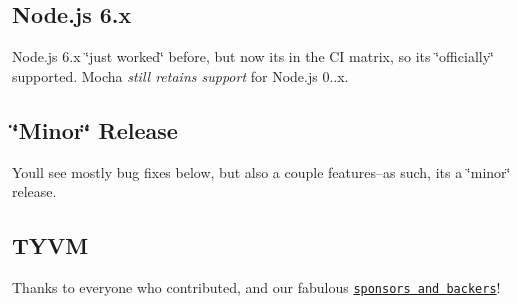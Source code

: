 \subsection*{Node.\+js 6.\+x}

Node.\+js 6.\+x \char`\"{}just worked\char`\"{} before, but now it\textquotesingle{}s in the CI matrix, so it\textquotesingle{}s \char`\"{}officially\char`\"{} supported. Mocha {\itshape still retains support} for Node.\+js 0..\+x.

\subsection*{\char`\"{}\+Minor\char`\"{} Release}

You\textquotesingle{}ll see mostly bug fixes below, but also a couple features--as such, it\textquotesingle{}s a \char`\"{}minor\char`\"{} release.

\subsection*{T\+Y\+VM}

Thanks to everyone who contributed, and our fabulous \href{https://opencollective.com/mochajs}{\tt sponsors and backers}!


